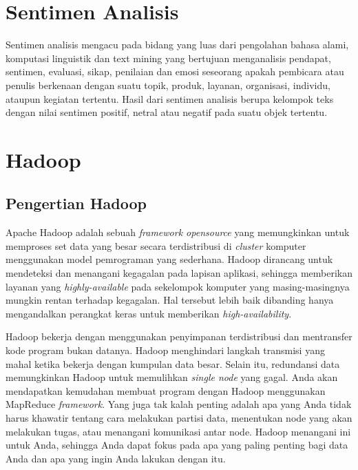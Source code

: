 \section{Sentimen Analisis}
\label{sec:sentimen_analisis}
Sentimen analisis mengacu pada bidang yang luas dari pengolahan bahasa alami, komputasi linguistik dan text mining yang bertujuan menganalisis pendapat, sentimen, evaluasi, sikap, penilaian dan emosi seseorang apakah pembicara atau penulis berkenaan dengan suatu topik, produk, layanan, organisasi, individu, ataupun kegiatan tertentu. \cite{liu2012sentiment} Hasil dari sentimen analisis berupa kelompok teks dengan nilai sentimen positif, netral atau negatif pada suatu objek tertentu.

\section{Hadoop}
\label{sec:hadoop}

\subsection{Pengertian Hadoop}
\label{sec:pengertian_hadoop}
Apache Hadoop adalah sebuah \textit{framework opensource} yang memungkinkan untuk memproses set data yang besar secara terdistribusi di \textit{cluster} komputer menggunakan model pemrograman yang sederhana. Hadoop dirancang untuk mendeteksi dan menangani kegagalan pada lapisan aplikasi, sehingga memberikan layanan yang \textit{highly-available} pada sekelompok komputer yang masing-masingnya mungkin rentan terhadap kegagalan. Hal tersebut lebih baik dibanding hanya mengandalkan perangkat keras untuk memberikan \textit{high-availability}.

Hadoop bekerja dengan menggunakan penyimpanan terdistribusi dan mentransfer kode program bukan datanya. Hadoop menghindari langkah transmisi yang mahal ketika bekerja dengan kumpulan data besar. Selain itu, redundansi data memungkinkan Hadoop untuk memulihkan \textit{single node} yang gagal. Anda akan mendapatkan kemudahan membuat program dengan Hadoop menggunakan MapReduce \textit{framework}. Yang juga tak kalah penting adalah apa yang Anda tidak harus khawatir tentang cara melakukan partisi data, menentukan node yang akan melakukan tugas, atau menangani komunikasi antar node. Hadoop menangani ini untuk Anda, sehingga Anda dapat fokus pada apa yang paling penting bagi data Anda dan apa yang ingin Anda lakukan dengan itu.

